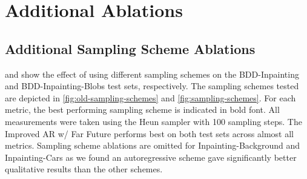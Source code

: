 \chapter{Additional Ablations}
\section{Additional Sampling Scheme Ablations}
 and  show the effect of using different sampling schemes on the BDD-Inpainting and BDD-Inpainting-Blobs test sets, respectively. The sampling schemes tested are depicted in \cref{fig:old-sampling-schemes} and \cref{fig:sampling-schemes}. For each metric, the best performing sampling scheme is indicated in bold font. All measurements were taken using the Heun sampler \cite{karras2022elucidating} with 100 sampling steps. The Improved AR w/ Far Future performs best on both test sets across almost all metrics. Sampling scheme ablations are omitted for Inpainting-Background and Inpainting-Cars as we found an autoregressive scheme gave significantly better qualitative results than the other schemes.
\begin{table}[h]
\centering
\caption{Effect of sampling schemes measured on the BDD-Inpainting test set.}
\label{table:samplingschemesnotblobs}
\end{table}
